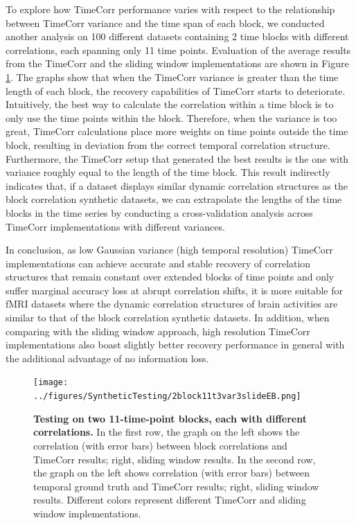 \documentclass[11pt]{article}
\begin{document}
To explore how TimeCorr performance varies with respect to the relationship between TimeCorr variance and the time span of each block, we conducted another analysis on 100 different datasets containing 2 time blocks with different correlations, each spanning only 11 time points. Evaluation of the average results from the TimeCorr and the sliding window implementations are shown in Figure \ref{fig:2block11t}. The graphs show that when the TimeCorr variance is greater than the time length of each block, the recovery capabilities of TimeCorr starts to deteriorate. Intuitively, the best way to calculate the correlation within a time block is to only use the time points within the block. Therefore, when the variance is too great, TimeCorr calculations place more weights on time points outside the time block, resulting in deviation from the correct temporal correlation structure. Furthermore, the TimeCorr setup that generated the best results is the one with variance roughly equal to the length of the time block. This result indirectly indicates that, if a dataset displays similar dynamic correlation structures as the block correlation synthetic datasets, we can extrapolate the lengths of the time blocks in the time series by conducting a cross-validation analysis across TimeCorr implementations with different variances.

In conclusion, as low Gaussian variance (high temporal resolution) TimeCorr implementations can achieve accurate and stable recovery of correlation structures that remain constant over extended blocks of time points and only suffer marginal accuracy loss at abrupt correlation shifts, it is more suitable for fMRI datasets where the dynamic correlation structures of brain activities are similar to that of the block correlation synthetic datasets. In addition, when comparing with the sliding window approach, high resolution TimeCorr implementations also boast slightly better recovery performance in general with the additional advantage of no information loss.

\begin{figure}[!htb]
\texttt{[image: ../figures/SyntheticTesting/2block11t3var3slideEB.png]}
\caption{\textbf{Testing on two 11-time-point blocks, each with different correlations.} In the first row, the graph on the left shows the correlation (with error bars) between block correlations and TimeCorr results; right, sliding window results. In the second row, the graph on the left shows correlation (with error bars) between temporal ground truth and TimeCorr results; right, sliding window results. Different colors represent different TimeCorr and sliding window implementations.}
\label{fig:2block11t}
\end{figure}
\end{document}
